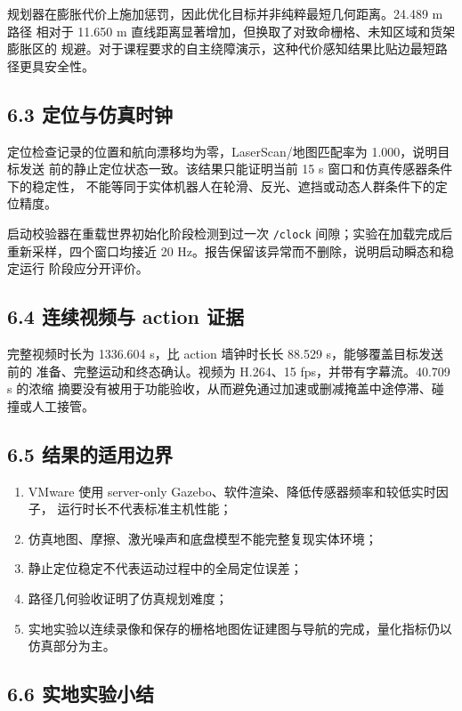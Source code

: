\documentclass[12pt,a4paper]{ctexart}
\begin{document}
规划器在膨胀代价上施加惩罚，因此优化目标并非纯粹最短几何距离。24.489 m 路径
相对于 11.650 m 直线距离显著增加，但换取了对致命栅格、未知区域和货架膨胀区的
规避。对于课程要求的自主绕障演示，这种代价感知结果比贴边最短路径更具安全性。

\subsection*{6.3 定位与仿真时钟}

定位检查记录的位置和航向漂移均为零，LaserScan/地图匹配率为 1.000，说明目标发送
前的静止定位状态一致。该结果只能证明当前 15 s 窗口和仿真传感器条件下的稳定性，
不能等同于实体机器人在轮滑、反光、遮挡或动态人群条件下的定位精度。

启动校验器在重载世界初始化阶段检测到过一次 \texttt{/clock} 间隙；实验在加载完成后
重新采样，四个窗口均接近 20 Hz。报告保留该异常而不删除，说明启动瞬态和稳定运行
阶段应分开评价。

\subsection*{6.4 连续视频与 action 证据}

完整视频时长为 1336.604 s，比 action 墙钟时长长 88.529 s，能够覆盖目标发送前的
准备、完整运动和终态确认。视频为 H.264、15 fps，并带有字幕流。40.709 s 的浓缩
摘要没有被用于功能验收，从而避免通过加速或删减掩盖中途停滞、碰撞或人工接管。

\subsection*{6.5 结果的适用边界}

\begin{enumerate}[label=\arabic*)]
  \item VMware 使用 server-only Gazebo、软件渲染、降低传感器频率和较低实时因子，
  运行时长不代表标准主机性能；
  \item 仿真地图、摩擦、激光噪声和底盘模型不能完整复现实体环境；
  \item 静止定位稳定不代表运动过程中的全局定位误差；
  \item 路径几何验收证明了仿真规划难度；
  \item 实地实验以连续录像和保存的栅格地图佐证建图与导航的完成，量化指标仍以
  仿真部分为主。
\end{enumerate}

\subsection*{6.6 实地实验小结}
\end{document}
